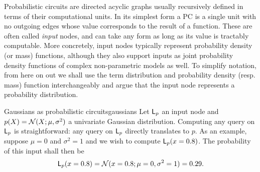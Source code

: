 Probabilistic circuits are directed acyclic graphs usually recursively defined in terms of their
computational units. In its simplest form a PC is a single unit with no outgoing edges whose value
corresponds to the result of a function. These are often called \emph{input} nodes, and can take
any form as long as its value is tractably computable. More concretely, input nodes typically
represent probability density (or mass) functions, although they also support inputs as joint
probability density functions of complex non-parametric models as well. To simplify notation, from
here on out we shall use the term distribution and probability density (resp. mass) function
interchangeably and argue that the input node represents a probability distribution.
\begin{example}[sidebyside,lefthand width=0.6\textwidth]{Gaussians as probabilistic circuits}{gaussians} %
  Let $\operatorname{\textsf{L}}_p$ an input node and $p(X)=\operatorname{\mathcal{N}}(X;\mu,\sigma^2)$ a univariate Gaussian
  distribution. Computing any query on $\operatorname{\textsf{L}}_p$ is straightforward: any query on
  $\operatorname{\textsf{L}}_p$ directly translates to $p$. As an example, suppose $\mu=0$ and $\sigma^2=1$ and
  we wish to compute $\operatorname{\textsf{L}}_p(x=0.8)$. The probability of this input shall then be
  \begin{equation*}
    \operatorname{\textsf{L}}_p(x=0.8)=\operatorname{\mathcal{N}}(x=0.8;\mu=0,\sigma^2=1)=0.29.
  \end{equation*}
  \tcblower
  \begin{center}


\end{center}
\end{example}
